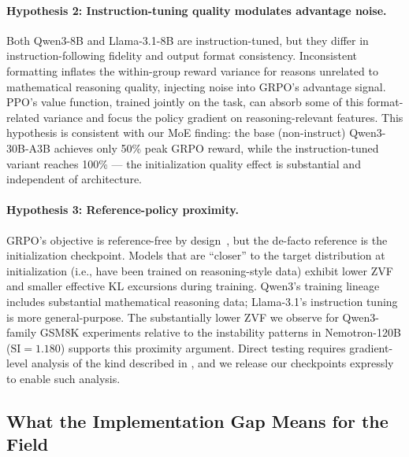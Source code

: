 \documentclass{article}
\begin{document}
\paragraph{Hypothesis 2: Instruction-tuning quality modulates advantage noise.}
Both Qwen3-8B and Llama-3.1-8B are instruction-tuned, but they differ in
instruction-following fidelity and output format consistency.
Inconsistent formatting inflates the within-group reward variance for reasons
unrelated to mathematical reasoning quality, injecting noise into GRPO's
advantage signal.
PPO's value function, trained jointly on the task, can absorb some of this
format-related variance and focus the policy gradient on reasoning-relevant
features.
This hypothesis is consistent with our MoE finding: the base (non-instruct)
Qwen3-30B-A3B achieves only 50\% peak GRPO reward, while the instruction-tuned
variant reaches 100\% --- the initialization quality effect is substantial and
independent of architecture.

\paragraph{Hypothesis 3: Reference-policy proximity.}
GRPO's objective is reference-free by design~\citep{shao2024deepseekmath},
but the de-facto reference is the initialization checkpoint.
Models that are ``closer'' to the target distribution at initialization (i.e.,
have been trained on reasoning-style data) exhibit lower ZVF and smaller
effective KL excursions during training.
Qwen3's training lineage includes substantial mathematical reasoning data;
Llama-3.1's instruction tuning is more general-purpose.
The substantially lower ZVF we observe for Qwen3-family GSM8K experiments
relative to the instability patterns in Nemotron-120B ($\text{SI} = 1.180$)
supports this proximity argument.
Direct testing requires gradient-level analysis of the kind described in
\citet{liu2025rlsubnetworks}, and we release our checkpoints expressly to
enable such analysis.

\subsection{What the Implementation Gap Means for the Field}
\label{sec:discuss_impl}
\end{document}

